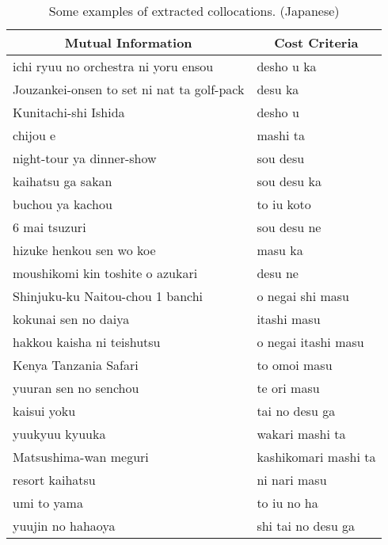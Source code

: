 \begin{table}[p]
\caption{Some examples of extracted collocations. (Japanese) }
\label{Tab:CollocationJapanese}
\begin{center}
\begin{tabular}{p{6.5cm}|p{6.5cm}}
\hline
\multicolumn{1}{c}{Mutual Information} & \multicolumn{1}{|c}{Cost Criteria} \\
\hline
ichi ryuu no orchestra ni yoru ensou            &  desho u ka  \\
Jouzankei-onsen to set ni nat ta golf-pack      &  desu ka  \\
Kunitachi-shi Ishida                            &  desho u  \\
chijou e                                        &  mashi ta  \\
night-tour ya dinner-show                       &  sou desu  \\
kaihatsu ga sakan                               &  sou desu ka  \\
buchou ya kachou                                &  to iu koto  \\
6 mai tsuzuri                                   &  sou desu ne  \\
hizuke henkou sen wo koe                        &  masu ka  \\
moushikomi kin toshite o azukari                &  desu ne  \\
Shinjuku-ku Naitou-chou 1 banchi                &  o negai shi masu  \\
kokunai sen no daiya                            &  itashi masu  \\
hakkou kaisha ni teishutsu                      &  o negai itashi masu  \\
Kenya Tanzania Safari                           &  to omoi masu  \\
yuuran sen no senchou                           &  te ori masu  \\
kaisui yoku                                     &  tai no desu ga  \\
yuukyuu kyuuka                                  &  wakari mashi ta  \\
Matsushima-wan meguri                           &  kashikomari mashi ta  \\
resort kaihatsu                                 &  ni nari masu  \\
umi to yama                                     &  to iu no ha  \\
yuujin no hahaoya                               &  shi tai no desu ga  \\

\end{tabular}
\end{center}
\end{table}
